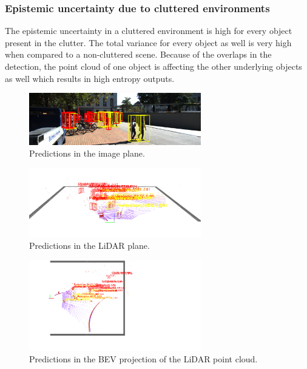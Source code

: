 \documentclass[10pt,twocolumn,letterpaper]{article}
\begin{document}
\subsubsection{Epistemic uncertainty due to cluttered environments}
The epistemic uncertainty in a cluttered environment is high for every object present in the clutter. The total variance for every object as well is very high when compared to a non-cluttered scene. Because of the overlaps in the detection, the point cloud of one object is affecting the other underlying objects as well which results in high entropy outputs.
\begin{figure}[!htbp]
        \centering
		\includegraphics[width=75mm, scale = 0.4]{images/Uncertainty_results/5226_cluttered_bbox.png}
        \caption[Extracted frustum point cloud after Normalization]{Predictions in the image plane.}
        \label{fig:Uncert_blockage-1}
\end{figure}
\begin{figure}[!htbp]
        \centering
		\includegraphics[width=75mm, scale = 0.4]{images/Uncertainty_results/5226_Follow_cam_view.png}
        \caption[Extracted frustum point cloud after Normalization]{Predictions in the LiDAR plane.}
        \label{fig:Uncert_blockage-1}
\end{figure}
\begin{figure}[!htbp]
        \centering
		\includegraphics[width=75mm,scale = 0.4]{images/Uncertainty_results/5226_cluttered.png}
        \caption[Extracted frustum point cloud after Normalization]{Predictions in the BEV projection of the LiDAR point cloud.}
        \label{fig:Uncert_blockage-1}
\end{figure}
\end{document}
